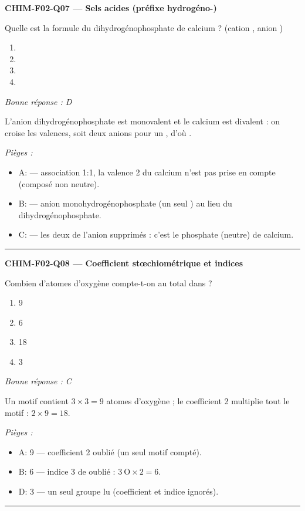 \documentclass[11pt,a4paper]{article}
\begin{document}
\noindent\textbf{CHIM-F02-Q07 --- Sels acides (préfixe hydrogéno-)}\par
Quelle est la formule du dihydrogénophosphate de calcium ? (cation , anion )
\begin{enumerate}[label=\Alph*)]
\item {}
\item {}
\item {}
\item {}
\end{enumerate}
\textit{Bonne réponse : D}\par
L'anion dihydrogénophosphate  est monovalent et le calcium est divalent : on croise les valences, soit deux anions pour un , d'où .\par
\textit{Pièges :}
\begin{itemize}
\item A:  --- association 1:1, la valence 2 du calcium n'est pas prise en compte (composé non neutre).
\item B:  --- anion monohydrogénophosphate  (un seul ) au lieu du dihydrogénophosphate.
\item C:  --- les deux  de l'anion supprimés : c'est le phosphate (neutre) de calcium.
\end{itemize}
\vspace{8pt}\hrule\vspace{8pt}

\noindent\textbf{CHIM-F02-Q08 --- Coefficient stœchiométrique et indices}\par
Combien d'atomes d'oxygène compte-t-on au total dans  ?
\begin{enumerate}[label=\Alph*)]
\item \num{9}
\item \num{6}
\item \num{18}
\item \num{3}
\end{enumerate}
\textit{Bonne réponse : C}\par
Un motif  contient $3\times 3 = 9$ atomes d'oxygène ; le coefficient 2 multiplie tout le motif : $2\times 9 = 18$.\par
\textit{Pièges :}
\begin{itemize}
\item A: \num{9} --- coefficient 2 oublié (un seul motif compté).
\item B: \num{6} --- indice 3 de  oublié : $3\ \text{O}\times 2 = 6$.
\item D: \num{3} --- un seul groupe  lu (coefficient et indice ignorés).
\end{itemize}
\vspace{8pt}\hrule\vspace{8pt}
\end{document}
